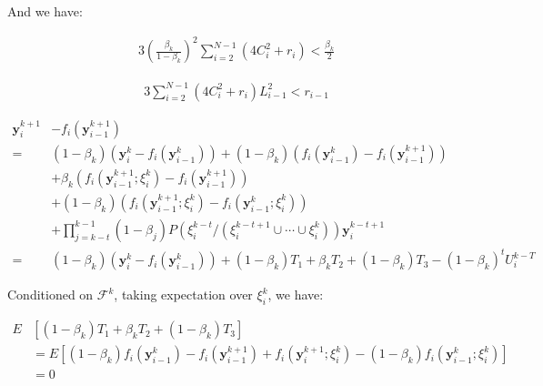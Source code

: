 And we have:

\begin{equation*}
\begin{split}
3\left ( \frac{\beta_k}{1-\beta_k} \right )^2\sum_{i=2}^{N-1}\left ( 4C_i^2+r_i \right )< \frac{\beta_k}{2}
\end{split}
\end{equation*}

\begin{equation*}
\begin{split}
3\sum_{i=2}^{N-1}\left ( 4C_i^2+r_i \right )L_{i-1}^2<r_{i-1}
\end{split}
\end{equation*}

\begin{equation*}
\begin{split}
\boldsymbol{y}_i^{k+1}&-f_i\left ( \boldsymbol{y}_{i-1}^{k+1} \right )\\
=&\left ( 1-\beta_k \right )\left ( \boldsymbol{y}_i^k-f_i\left ( \boldsymbol{y}_{i-1}^k \right ) \right )+\left ( 1-\beta_k \right )\left ( f_i\left ( \boldsymbol{y}_{i-1}^k\right )-f_i\left ( \boldsymbol{y}_{i-1}^{k+1} \right ) \right ) \\
&+\beta_k\left ( f_i\left ( \boldsymbol{y}_{i-1}^{k+1};\xi_i^k \right )-f_i\left ( \boldsymbol{y}_{i-1}^{k+1} \right ) \right )\\
&+\left ( 1-\beta_k \right )\left ( f_i\left ( \boldsymbol{y}_{i-1}^{k+1};\xi_i^k \right )-f_i\left ( \boldsymbol{y}_{i-1}^k;\xi_i^k \right ) \right )\\
&+\prod _{j=k-t}^{k-1}\left ( 1-\beta_j \right )P\left ( \xi_i^{k-t}/\left ( 
\xi_i^{k-t+1}\cup \cdots \cup\xi_i^k \right ) \right )\boldsymbol{y}_i^{k-t+1}\\
=&\left ( 1-\beta_k \right )\left ( \boldsymbol{y}_i^k-f_i\left ( \boldsymbol{y}_{i-1}^k \right ) \right )+\left ( 1-\beta_k \right )T_1+\beta_kT_2+\left ( 1-\beta_k \right )T_3-\left ( 1-\beta_k \right )^tU_i^{k-T}
\end{split}
\end{equation*}

Conditioned on $\mathcal{F}^k$, taking expectation over $\xi_i^k$, we have:

\begin{equation*}
\begin{split}
E&\left [ \left ( 1-\beta_k \right )T_1+\beta_kT_2+\left ( 1-\beta_k \right )T_3 \right ]\\
&=E\left [ \left ( 1-\beta_k \right )f_i\left ( \boldsymbol{y}_{i-1}^k \right )-f_i\left ( \boldsymbol{y}_{i-1}^{k+1}\right )+f_i\left ( \boldsymbol{y}_i^{k+1};\xi_i^k  \right )-\left ( 1-\beta_k \right )f_i\left ( \boldsymbol{y}_{i-1}^k;\xi_i^k \right ) \right ]\\
&=0
\end{split}
\end{equation*}

